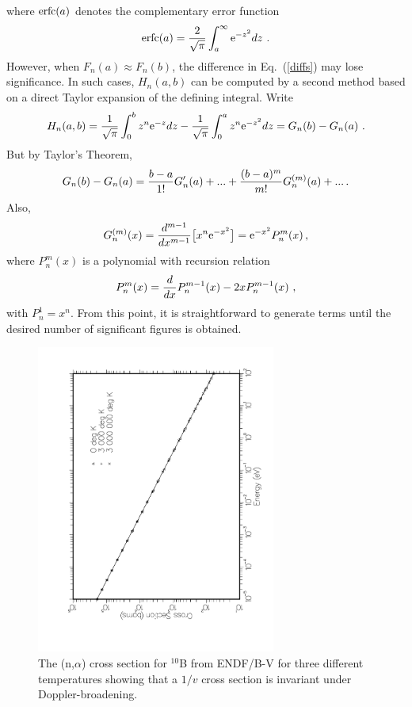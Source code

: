 where ${\rm erfc}(a)$ denotes the complementary error function
\begin{equation}
  {\rm erfc}(a)={2\over \sqrt{\pi}}
    \int_a^\infty {\rm e}^{-z^2}dz\,\,.
\end{equation}
However, when $F_n(a)\approx F_n(b)$, the difference in
Eq.~(\ref{diffs}) may lose significance.  In such cases,
$H_n(a,b)$ can be computed by a second method based on a
direct Taylor expansion of the defining integral.  Write
\begin{equation}
  H_n(a,b)={1\over \sqrt{\pi}}\int_0^b z^n {\rm e}^{-z}
    dz-{1\over \sqrt{\pi}}\int_0^a z^n {\rm e}^{-z^2}dz
    =G_n(b)-G_n(a)\,\,.
\label{alt1}
\end{equation}
But by Taylor's Theorem,
\begin{equation}
  G_n(b)-G_n(a)=
    {{b-a}\over {1!}}G'_n(a)+...+
    {{(b-a)^m}\over{m!}}G_n^{(m)}(a)+... \,.
\end{equation}
Also,
\begin{equation}
  G_n^{(m)}(x)={{d^{m-1}}\over{dx^{m-1}}}
    \bigl[ x^n{\rm e}^{-x^2} \bigr] =
    {\rm e}^{-x^2} P_n^m(x)\,,
\end{equation}
where $P_n^m(x)$ is a polynomial with recursion relation
\begin{equation}
  P_n^m(x)={d\over{dx}}P_n^{m-1}(x)-2xP_n^{m-1}(x)\,\,,
\label{alt2}
\end{equation}
with $P_n^1=x^n$.  From this point, it is straightforward to
generate terms until the desired number of significant figures
is obtained.

\begin{figure}[t]\centering
\includegraphics[keepaspectratio, height=4.0in, angle=270]{figs/broadr1ack}
\caption[The $^{10}$B (n,$\alpha$) cross section versus Doppler broadening
temperature]
{The (n,$\alpha$) cross section for $^{10}$B
        from ENDF/B-V for three different temperatures showing that
        a $1/v$ cross section is invariant under Doppler-broadening.}
\label{over}
\end{figure}

